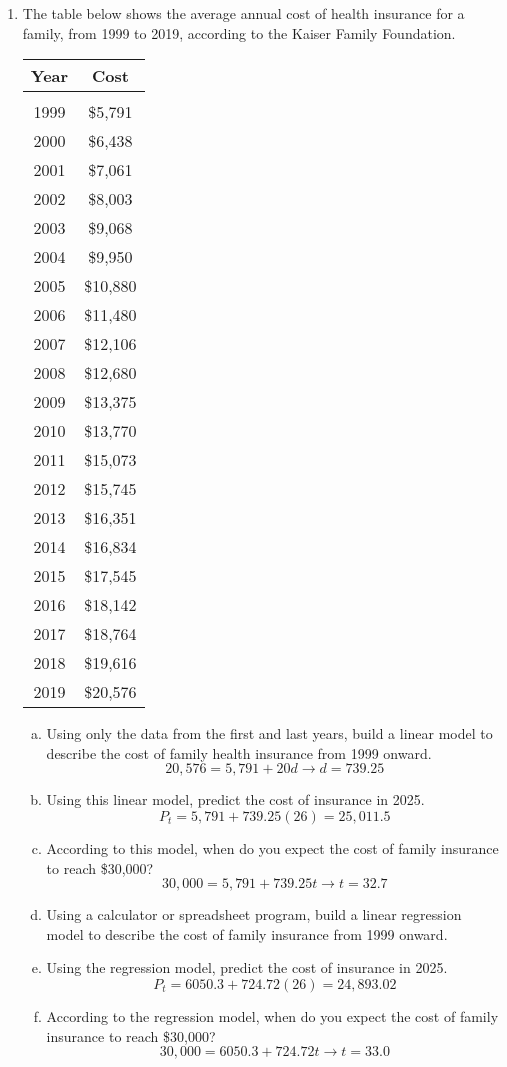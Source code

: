 \begin{enumerate}
\item The table below shows the average annual cost of health insurance for a family, from 1999 to 2019, according to the Kaiser Family Foundation.
\begin{center}
\begin{tabular}{c c}
\textbf{Year} & \textbf{Cost}\\
\hline
 & \\
1999 & \$5,791\\
2000 & \$6,438\\
2001 & \$7,061\\
2002 & \$8,003\\
2003 & \$9,068\\
2004 & \$9,950\\
2005 & \$10,880\\
2006 & \$11,480\\
2007 & \$12,106\\
2008 & \$12,680\\
2009 & \$13,375\\
2010 & \$13,770\\
2011 & \$15,073\\
2012 & \$15,745\\
2013 & \$16,351\\
2014 & \$16,834\\
2015 & \$17,545\\
2016 & \$18,142\\
2017 & \$18,764\\
2018 & \$19,616\\
2019 & \$20,576
\end{tabular}
\end{center}
\begin{enumerate}[(a)]
\item Using only the data from the first and last years, build a linear model to describe the cost of family health insurance from 1999 onward. 
\[20,576 = 5,791 + 20d \longrightarrow d = 739.25\]
\item Using this linear model, predict the cost of insurance in 2025. 
\[P_t = 5,791 + 739.25(26) = 25,011.5\]
\item According to this model, when do you expect the cost of family insurance to reach \$30,000? 
\[30,000 = 5,791 + 739.25t \longrightarrow t = 32.7\]
\item Using a calculator or spreadsheet program, build a linear regression model to describe the cost of family insurance from 1999 onward. 
\item Using the regression model, predict the cost of insurance in 2025. 
\[P_t = 6050.3 + 724.72(26) = 24,893.02\]
\item According to the regression model, when do you expect the cost of family insurance to reach \$30,000? 
\[30,000 = 6050.3 + 724.72t \longrightarrow t = 33.0\]
\end{enumerate}
\end{enumerate}